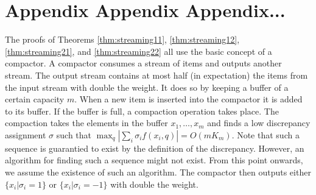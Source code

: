 \documentclass[anon,12pt]{colt2019} %
\newcommand{\eps}{\epsilon}
\newcommand{\komconstant}{c}
\begin{document}
%
%


\section{Appendix Appendix Appendix...}


The proofs of Theorems \ref{thm:streaming11}, \ref{thm:streaming12}, \ref{thm:streaming21}, and \ref{thm:streaming22} all use the basic concept of a compactor. A compactor consumes a stream of items and outputs another stream. 
The output stream contains at most half (in expectation) the items from the input stream with double the weight. 
It does so by keeping a buffer of a certain capacity $m$. When a new item is inserted into the compactor it is added to its buffer. 
If the buffer is full, a compaction operation takes place. 
The compaction takes the elements in the buffer $x_1,\ldots,x_m$ and finds a low discrepancy assignment $\sigma$ such that 
$\max_q |\sum_i \sigma_i f(x_i,q)| = O(mK_m)$. 
Note that such a sequence is guarantied to exist by the definition of the discrepancy. 
However, an algorithm for finding such a sequence might not exist. 
From this point onwards, we assume the existence of such an algorithm.
The compactor then outputs either $\{ x_i | \sigma_i = 1\}$ or  $\{ x_i | \sigma_i = -1\}$ with double the weight.
\end{document}
